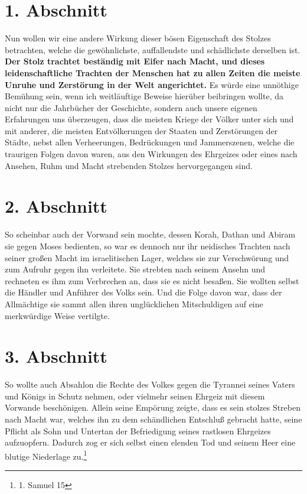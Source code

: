 \newpage

\section{1. Abschnitt} \label{kap8_ab1}

Nun wollen wir eine andere Wirkung dieser bösen Eigenschaft des Stolzes
betrachten, welche die gewöhnlichste, auffallendste und schädlichste derselben
ist.
\label{ref:08_01_stolz} \textbf{
    Der Stolz trachtet beständig mit Eifer nach Macht, und
dieses leidenschaftliche Trachten der Menschen hat zu allen Zeiten die meiste
Unruhe und Zerstörung in der Welt angerichtet.
}Es würde eine unnöthige Bemühung sein,
wenn ich weitläuftige Beweise hierüber beibringen wollte, da nicht nur die
Jahrbücher der Geschichte, sondern auch unsere eigenen Erfahrungen uns
überzeugen, dass die meisten Kriege der Völker unter sich und mit
anderer, die
meisten Entvölkerungen der Staaten und Zerstörungen der Städte, nebst allen
Verheerungen, Bedrückungen und Jammerszenen,
welche die traurigen Folgen davon waren, aus den Wirkungen des
Ehrgeizes oder eines nach Ansehen, Ruhm und Macht strebenden Stolzes
hervorgegangen sind.

\section{2. Abschnitt} \label{kap8_ab2}

So scheinbar auch der Vorwand sein mochte, dessen Korah,
Dathan und Abiram sie
gegen Moses bedienten, so war es dennoch nur ihr
neidisches Trachten nach seiner
großen Macht im israelitischen Lager, welches sie zur Verschwörung und zum
Aufruhr gegen ihn verleitete. Sie strebten nach seinem Ansehn und rechneten es
ihm zum Verbrechen an, dass sie es nicht besaßen. Sie wollten selbst die Händler
und Anführer des Volks sein. Und die Folge davon war, dass der Allmächtige sie
sammt allen ihren unglücklichen Mitschuldigen auf eine merkwürdige Weise
vertilgte.

\section{3. Abschnitt} \label{kap8_ab3}

So wollte auch Absahlon die Rechte des Volkes gegen
die Tyrannei seines Vaters
und Königs in Schutz nehmen, oder vielmehr seinen Ehrgeiz mit diesem Vorwande
beschönigen. Allein seine Empörung zeigte, dass es sein stolzes Streben nach
Macht war, welches ihn zu dem schändlichen Entschluß gebracht hatte, seine
Pflicht als Sohn und Untertan der Befriedigung seines rastlosen Ehrgeizes
aufzuopfern. Dadurch zog er sich selbst einen elenden Tod und seinem Heer eine
blutige Niederlage zu.\footnote{1. Samuel 15}

